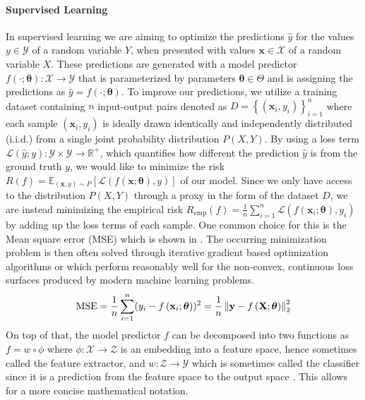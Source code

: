 \paragraph{Supervised Learning}
In supervised learning we are aiming to optimize the predictions $\hat{y}$ for the values $y \in \mathcal{Y}$ of a random variable $Y$, when presented with values $\mathbf{x} \in \mathcal{X}$ of a random variable $X$. These predictions are generated with a model predictor $f(\cdot;\boldsymbol{\theta}): \mathcal{X} \rightarrow \mathcal{Y}$ that is parameterized by parameters $\boldsymbol{\theta} \in \Theta$  and is assigning the predictions as $\hat{y}=f(\cdot;\boldsymbol{\theta})$. To improve our predictions, we utilize a training dataset containing $n$ input-output pairs denoted as $D=\left\{\left(\mathbf{x}_{i}, y_{i}\right)\right\}_{i=1}^{n}$ where each sample $(\mathbf{x}_i,y_i)$ is ideally drawn identically and independently distributed (i.i.d.) from a single joint probability distribution $P(X,Y)$. By using a loss term $\mathcal{L} (\hat{y};y): \mathcal{Y} \times \mathcal{Y} \rightarrow \mathbb{R}^{+}$, which quantifies how different the prediction $\hat{y}$ is from the ground truth $y$, we would like to minimize the risk $R(f) = \mathbb{E}_{(\mathbf{x}, y) \sim P}[\mathcal{L}(f(\mathbf{x}; \boldsymbol{\theta}), y)]$ of our model. Since we only have access to the distribution $P(X,Y)$ through a proxy in the form of the dataset $D$, we are instead minimizing the empirical risk $R_{\mathrm{emp}}(f)=\frac{1}{n} \sum_{i=1}^n \mathcal{L}\left(f\left(\mathbf{x}_{i};\boldsymbol{\theta}\right), y_{i}\right)$ by adding up the loss terms of each sample. One common choice for this is the Mean square error (MSE) which is shown in . The occurring minimization problem is then often solved through iterative gradient based optimization algorithms \eg \sgd{} \citep{Robbins1951} or \adam \citep{Kingma2015} which perform reasonably well for the non-convex, continuous loss surfaces produced by modern machine learning problems.
\begin{equation}
\label{eq:mse}
    \text{MSE}=\frac{1}{n} \sum_{i=1}^n (y_i-f\left(\mathbf{x}_{i};\boldsymbol{\theta}\right))^{2} = \frac{1}{n}\left\lVert \mathbf{y}-f\left(\mathbf{X};\boldsymbol{\theta}\right)\right\rVert_2^2
\end{equation}
On top of that, the model predictor $f$ can be decomposed into two functions as $f=w \circ \phi$ where $\phi: \mathcal{X} \rightarrow \mathcal{Z}$ is an embedding into a feature space, hence sometimes called the feature extractor, and $w: \mathcal{Z} \rightarrow \mathcal{Y}$ which is sometimes called the classifier since it is a prediction from the feature space to the output space \citep{gulrajani2020search, MotiianPAD17}. This allows for a more concise mathematical notation.

